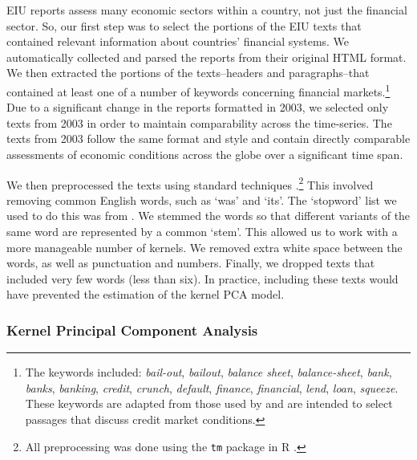 \documentclass[]{article}
\begin{document}
EIU reports assess many economic sectors within a country,
not just the financial sector. So, our first step was to select the portions of the EIU texts that contained relevant information about countries' financial systems. We automatically collected and parsed the reports from their original HTML format. We then extracted the portions of the texts--headers and paragraphs--that contained at least one of a number of keywords concerning financial markets.\footnote{The
  keywords included: \emph{bail-out}, \emph{bailout}, \emph{balance
  sheet}, \emph{balance-sheet}, \emph{bank}, \emph{banks},
  \emph{banking}, \emph{credit}, \emph{crunch}, \emph{default},
  \emph{finance}, \emph{financial}, \emph{lend}, \emph{loan},
  \emph{squeeze}. These keywords are adapted
  from those used by \cite{Romer2015} and are intended to
  select passages that discuss credit market conditions.} Due to a significant change in the reports formatted in 2003, we
selected only texts from 2003 in order to maintain comparability across the time-series. The texts from 2003 follow the same format and style and contain directly comparable assessments of economic conditions across the globe over a significant time span.

We then preprocessed the texts using standard techniques \citep[see][]{Grimmer2013}.\footnote{All preprocessing was done using the \texttt{tm} package \citep{tm2015} in R \citep{R-cite}.} This involved removing common English words, such as `was' and `its'. The `stopword' list we used to do this was from \cite{dhillon:modha:mlj01}. We stemmed the words so that different variants of the same word are represented by a common `stem'. This allowed us to work with a more manageable number of kernels. We removed extra white space between the words, as well as punctuation and numbers. Finally, we dropped texts that included very few words (less than six). In practice, including these texts would have prevented the estimation of the kernel PCA model.

\subsubsection{Kernel Principal Component
Analysis}\label{kernel-principal-component-analysis}
\end{document}
